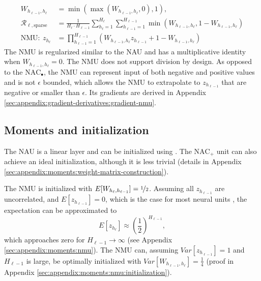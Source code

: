 \begin{align}
W_{h_{\ell-1},h_\ell} &= \min(\max(W_{h_{\ell-1},h_\ell}, 0), 1), \\
\mathcal{R}_{\ell,\mathrm{sparse}} &= \frac{1}{H_\ell \cdot H_{\ell-1}} \sum_{h_\ell=1}^{H_\ell} \sum_{h_{\ell-1}=1}^{H_{\ell-1}} \min\left(W_{h_{\ell-1},h_\ell}, 1 - W_{h_{\ell-1},h_\ell}\right) \\
\textrm{NMU}:\ z_{h_\ell} &= \prod_{h_{\ell-1}=1}^{H_{\ell-1}} \left(W_{h_{\ell-1},h_\ell} z_{h_{\ell-1}} + 1 - W_{h_{\ell-1},h_\ell} \right) \label{eq:nmu-defintion}
\end{align}
The NMU is regularized similar to the NAU and has a multiplicative identity when $W_{h_{\ell-1},h_\ell}=0$.
The NMU does not support division by design.
As opposed to the $\mathrm{NAC}_{\bullet}$, the NMU can represent input of both negative and positive values and is not $\epsilon$ bounded, which allows the NMU to extrapolate to $z_{h_{\ell-1}}$ that are negative or smaller than $\epsilon$. Its gradients are derived in Appendix \ref{sec:appendix:gradient-derivatives:gradient-nmu}.

\subsection{Moments and initialization}
The NAU is a linear layer and can be initialized using \citet{glorot-initialization}. The $\mathrm{NAC}_{+}$ unit can also achieve an ideal initialization, although it is less trivial (details in Appendix \ref{sec:appendix:moments:weight-matrix-construction}).

The NMU is initialized with $E[W_{h_{\ell}, h_{\ell - 1}}] = \nicefrac{1}{2}$. Assuming all $z_{h_{\ell-1}}$ are uncorrelated, and $E[z_{h_{\ell-1}}] = 0$, which is the case for most neural units \cite{glorot-initialization}, the expectation can be approximated to
\begin{equation}
E[z_{h_\ell}] \approx \left(\frac{1}{2}\right)^{H_{\ell-1}},
\end{equation}
which approaches zero for $H_{\ell-1} \rightarrow \infty$ (see Appendix \ref{sec:appendix:moments:nmu}). The NMU can, assuming $Var[z_{h_{\ell-1}}] = 1$ and $H_{\ell-1}$ is large, be optimally initialized with $Var[W_{h_{\ell-1},h_\ell}] = \frac{1}{4}$ (proof in Appendix \ref{sec:appendix:moments:nmu:initialization}).


